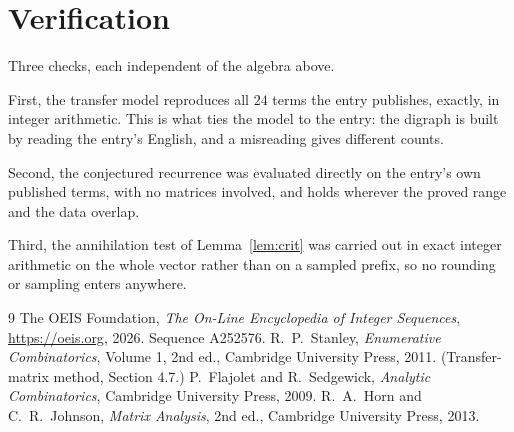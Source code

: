 \documentclass[11pt,a4paper]{article}
\theoremstyle{plain}
\theoremstyle{definition}
\begin{document}
\section{Verification}

Three checks, each independent of the algebra above.

First, the transfer model reproduces all $24$ terms the entry publishes, exactly, in
integer arithmetic. This is what ties the model to the entry: the digraph is built by reading
the entry's English, and a misreading gives different counts.

Second, the conjectured recurrence was evaluated directly on the entry's own published terms,
with no matrices involved, and holds wherever the proved range and the data overlap.

Third, the annihilation test of Lemma~\ref{lem:crit} was carried out in exact integer
arithmetic on the whole vector rather than on a sampled prefix, so no rounding or sampling
enters anywhere.

\begin{thebibliography}{9}
 The OEIS Foundation, \emph{The On-Line Encyclopedia of Integer
Sequences}, \url{https://oeis.org}, 2026. Sequence A252576.
 R.~P.~Stanley, \emph{Enumerative Combinatorics}, Volume 1, 2nd ed.,
Cambridge University Press, 2011. (Transfer-matrix method, Section 4.7.)
 P.~Flajolet and R.~Sedgewick, \emph{Analytic Combinatorics}, Cambridge
University Press, 2009.
 R.~A.~Horn and C.~R.~Johnson, \emph{Matrix Analysis}, 2nd ed., Cambridge
University Press, 2013.
\end{thebibliography}
\end{document}

